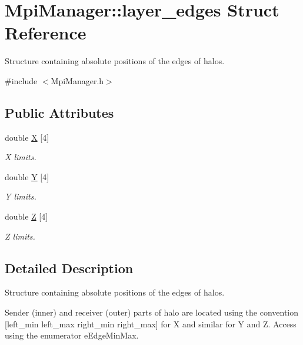 \hypertarget{struct_mpi_manager_1_1layer__edges}{}\section{Mpi\+Manager\+:\+:layer\+\_\+edges Struct Reference}
\label{struct_mpi_manager_1_1layer__edges}


Structure containing absolute positions of the edges of halos.  




{\ttfamily \#include $<$Mpi\+Manager.\+h$>$}

\subsection*{Public Attributes}
\begin{DoxyCompactItemize}
\item 
double \hyperlink{struct_mpi_manager_1_1layer__edges_a9f79fa4b504f2d4418f2bc4747cc908c}{X} \mbox{[}4\mbox{]}
\begin{DoxyCompactList}\small\item\em X limits. \end{DoxyCompactList}\item 
double \hyperlink{struct_mpi_manager_1_1layer__edges_aa4d880e027a6410ff4b34e28dcd1f9d4}{Y} \mbox{[}4\mbox{]}
\begin{DoxyCompactList}\small\item\em Y limits. \end{DoxyCompactList}\item 
double \hyperlink{struct_mpi_manager_1_1layer__edges_a25eea1176a0c06c1e25a7a08b8840283}{Z} \mbox{[}4\mbox{]}
\begin{DoxyCompactList}\small\item\em Z limits. \end{DoxyCompactList}\end{DoxyCompactItemize}


\subsection{Detailed Description}
Structure containing absolute positions of the edges of halos. 

Sender (inner) and receiver (outer) parts of halo are located using the convention \mbox{[}left\+\_\+min left\+\_\+max right\+\_\+min right\+\_\+max\mbox{]} for X and similar for Y and Z. Access using the enumerator e\+Edge\+Min\+Max. 

